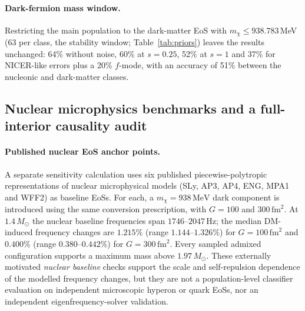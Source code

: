 \documentclass[11pt,a4paper]{article}
\newcommand{\Msun}{M_\odot}
\begin{document}
\paragraph{Dark-fermion mass window.} Restricting the main population to the dark-matter EoS with $m_\chi\le938.783$\,MeV (63 per class, the stability window; Table~\ref{tab:priors}) leaves the results unchanged: 64\% without noise, 60\% at $s=0.25$, 52\% at $s=1$ and 37\% for NICER-like errors plus a 20\% $f$-mode, with an accuracy of 51\% between the nucleonic and dark-matter classes.

\subsection{Nuclear microphysics benchmarks and a full-interior causality audit}\label{sec:causalcheck}
\paragraph{Published nuclear EoS anchor points.} A separate sensitivity calculation uses six published piecewise-polytropic representations of nuclear microphysical models (SLy, AP3, AP4, ENG, MPA1 and WFF2) as baseline EoSs. For each, a $m_\chi=938\,\mathrm{MeV}$ dark component is introduced using the same conversion prescription, with $G=100$ and $300\,\mathrm{fm}^2$. At $1.4\,\Msun$ the nuclear baseline frequencies span $1746$--$2047\,\mathrm{Hz}$; the median DM-induced frequency changes are $1.215\%$ (range $1.144$--$1.326\%$) for $G=100\,\mathrm{fm}^2$ and $0.400\%$ (range $0.380$--$0.442\%$) for $G=300\,\mathrm{fm}^2$. Every sampled admixed configuration supports a maximum mass above $1.97\,\Msun$. These externally motivated \emph{nuclear baseline} checks support the scale and self-repulsion dependence of the modelled frequency changes, but they are not a population-level classifier evaluation on independent microscopic hyperon or quark EoSs, nor an independent eigenfrequency-solver validation.
\end{document}
